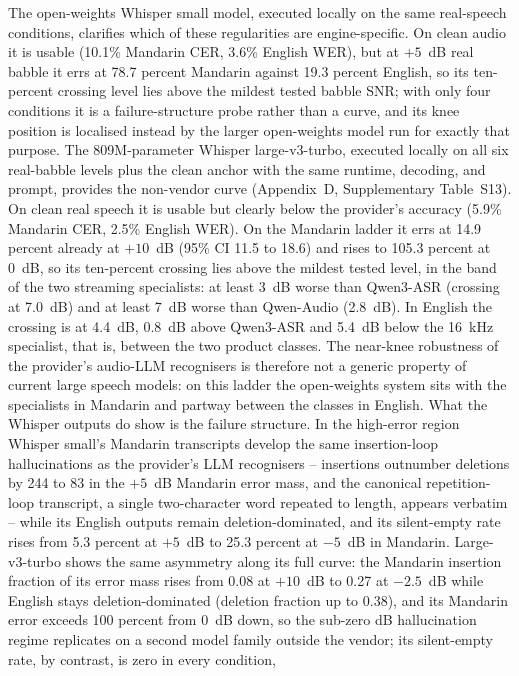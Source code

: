 The open-weights Whisper small model, executed locally on the same
real-speech conditions, clarifies which of these regularities are
engine-specific. On clean audio it is usable (10.1\% Mandarin CER, 3.6\%
English WER), but at $+5$~dB real babble it errs at 78.7 percent Mandarin
against 19.3 percent English, so its ten-percent crossing level lies above
the mildest tested babble SNR; with only four conditions it is a
failure-structure probe rather than a curve, and its knee position is
localised instead by the larger open-weights model run for exactly that
purpose. The 809M-parameter Whisper large-v3-turbo, executed locally on
all six real-babble levels plus the clean anchor with the same runtime,
decoding, and prompt, provides the non-vendor curve
(Appendix~D, Supplementary Table~S13). On clean real speech it is usable
but clearly below the provider's accuracy (5.9\% Mandarin CER, 2.5\%
English WER). On the Mandarin ladder it errs at 14.9 percent already at
$+10$~dB (95\% CI 11.5 to 18.6) and rises to 105.3 percent at 0~dB, so
its ten-percent crossing lies above the mildest tested level, in the band
of the two streaming specialists: at least 3~dB worse than Qwen3-ASR
(crossing at 7.0~dB) and at least 7~dB worse than Qwen-Audio (2.8~dB).
In English the crossing is at 4.4~dB, 0.8~dB above Qwen3-ASR and 5.4~dB
below the 16~kHz specialist, that is, between the two product classes.
The near-knee robustness of the provider's audio-LLM recognisers is
therefore not a generic property of current large speech models: on this
ladder the open-weights system sits with the specialists in Mandarin and
partway between the classes in English. What the Whisper outputs do show is the failure
structure. In the high-error region Whisper small's Mandarin transcripts develop the
same insertion-loop hallucinations as the provider's LLM recognisers --
insertions outnumber deletions by 244 to 83 in the $+5$~dB Mandarin error
mass, and the canonical repetition-loop transcript, a single two-character
word repeated to length, appears verbatim -- while its English outputs
remain deletion-dominated, and its silent-empty rate rises from 5.3 percent
at $+5$~dB to 25.3 percent at $-5$~dB in Mandarin. Large-v3-turbo shows
the same asymmetry along its full curve: the Mandarin insertion fraction
of its error mass rises from 0.08 at $+10$~dB to 0.27 at $-2.5$~dB while
English stays deletion-dominated (deletion fraction up to 0.38), and its
Mandarin error exceeds 100 percent from 0~dB down, so the sub-zero
dB hallucination regime replicates on a second model family outside the
vendor; its silent-empty rate, by contrast, is zero in every condition,
